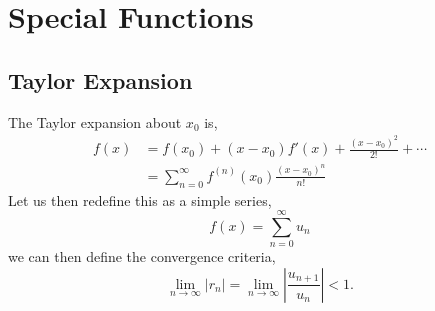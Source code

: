 \documentclass{book}
\begin{document}
\chapter{Special Functions}
\section{Taylor Expansion}
The Taylor expansion about $x_0$ is,
\begin{equation}
	\begin{split}
		f(x) & = f(x_0) + (x-x_0)f'(x) + \frac{(x-x_0)^2}{2!} + \cdots \\
		& = \sum_{n=0}^{\infty}f^{(n)}(x_0)\frac{(x-x_0)^n}{n!}
	\end{split}
\end{equation}
Let us then redefine this as a simple series,
\begin{equation}
	f(x) = \sum_{n=0}^{\infty}u_n
\end{equation}
we can then define the convergence criteria,
\begin{equation}
	\lim_{n\to\infty}|r_n| = \lim_{n\to\infty}\left|\frac{u_{n+1}}{u_n}\right| < 1.
\end{equation}
\end{document}
